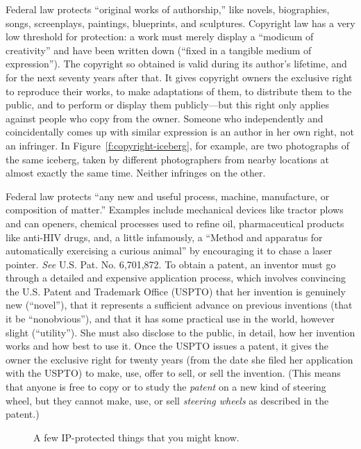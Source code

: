 
Federal  law protects ``original works of authorship,''
like novels, biographies, songs, screenplays, paintings, blueprints, and
sculptures. Copyright law has a very low threshold for protection: a work must
merely display a ``modicum of creativity'' and have been written down (``fixed
in a tangible medium of expression'').  The copyright so obtained is valid
during its author's lifetime, and for the next seventy years after that. It
gives copyright owners the exclusive right to reproduce their works, to make
adaptations of them, to distribute them to the public, and to perform or
display them publicly---but this right only applies against people who copy
from the owner. Someone who independently and coincidentally comes up with
similar expression is an author in her own right, not an infringer. In
Figure~\ref{f:copyright-iceberg}, for
example, are two photographs of the same iceberg, taken by different
photographers from nearby locations at almost exactly the same time. Neither
infringes on the other.

Federal  law protects ``any new and useful process,
machine, manufacture, or composition of matter.'' Examples include mechanical
devices like tractor plows and can openers, chemical processes used to refine
oil, pharmaceutical products like anti-HIV drugs, and, a little infamously, a
``Method and apparatus for automatically exercising a curious animal'' by
encouraging it to chase a laser pointer. \textit{See} U.S. Pat. No. 6,701,872.
To obtain a patent, an inventor must go through a detailed and expensive
application process, which involves convincing the U.S. Patent and Trademark
Office (USPTO) that her invention is genuinely new (``novel''), that it
represents a sufficient advance on previous inventions (that it be
``nonobvious''), and that it has some practical use in the world, however
slight (``utility''). She must also disclose to the public, in detail, how her
invention works and how best to use it. Once the USPTO issues a patent, it
gives the owner the exclusive right for twenty years (from the date she filed
her application with the USPTO) to make, use, offer to sell, or sell the
invention. (This means that anyone is free to copy or to study the
\textit{patent} on a new kind of steering wheel, but they cannot make, use, or
sell \textit{steering wheels} as described in the patent.)

\begin{figure}
\begin{center}
\end{center}
\caption{A few IP-protected things that you might know.}
\label{f:ip-designs}
\end{figure}


